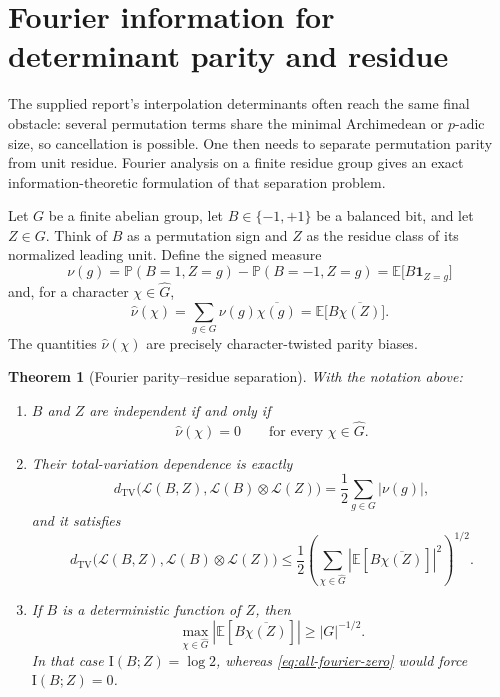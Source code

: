 \documentclass[11pt,oneside]{article}
\newtheorem{theorem}{Theorem}[section]
\theoremstyle{definition}
\theoremstyle{remark}
\newcommand{\Pp}{\mathbb{P}}
\newcommand{\E}{\mathbb{E}}
\newcommand{\II}{\mathrm{I}}
\newcommand{\TV}{d_{\mathrm{TV}}}
\newcommand{\abs}[1]{\left|#1\right|}
\begin{document}
\section{Fourier information for determinant parity and residue}\label{sec:fourier}

The supplied report's interpolation determinants often reach the same final obstacle: several permutation terms share the minimal Archimedean or \(p\)-adic size, so cancellation is possible.  One then needs to separate permutation parity from unit residue.  Fourier analysis on a finite residue group gives an exact information-theoretic formulation of that separation problem.

Let \(G\) be a finite abelian group, let \(B\in\{-1,+1\}\) be a balanced bit, and let \(Z\in G\).  Think of \(B\) as a permutation sign and \(Z\) as the residue class of its normalized leading unit.  Define the signed measure
\begin{equation}\label{eq:signed-measure}
 \nu(g)=\Pp(B=1,Z=g)-\Pp(B=-1,Z=g)
       =\E\bigl[B\mathbf1_{Z=g}\bigr]
\end{equation}
and, for a character \(\chi\in\widehat G\),
\begin{equation}\label{eq:fourier-correlation}
 \widehat\nu(\chi)=\sum_{g\in G}\nu(g)\overline{\chi(g)}
 =\E\bigl[B\overline{\chi(Z)}\bigr].
\end{equation}
The quantities \(\widehat\nu(\chi)\) are precisely character-twisted parity biases.

\begin{theorem}[Fourier parity--residue separation]\label{thm:fourier-separation}
With the notation above:
\begin{enumerate}
 \item \(B\) and \(Z\) are independent if and only if
 \begin{equation}\label{eq:all-fourier-zero}
  \widehat\nu(\chi)=0\qquad\text{for every }\chi\in\widehat G.
 \end{equation}
 \item Their total-variation dependence is exactly
 \begin{equation}\label{eq:tv-nu}
  \TV\bigl(\mathcal L(B,Z),\mathcal L(B)\otimes\mathcal L(Z)\bigr)
  =\frac12\sum_{g\in G}\abs{\nu(g)},
 \end{equation}
 and it satisfies
 \begin{equation}\label{eq:tv-fourier}
  \TV\bigl(\mathcal L(B,Z),\mathcal L(B)\otimes\mathcal L(Z)\bigr)
  \leq\frac12\left(\sum_{\chi\in\widehat G}
  \abs{\E[B\overline{\chi(Z)}]}^2\right)^{1/2}.
 \end{equation}
 \item If \(B\) is a deterministic function of \(Z\), then
 \begin{equation}\label{eq:deterministic-correlation}
  \max_{\chi\in\widehat G}
  \abs{\E[B\overline{\chi(Z)}]}
  \geq\abs{G}^{-1/2}.
 \end{equation}
 In that case \(\II(B;Z)=\log2\), whereas \eqref{eq:all-fourier-zero} would force \(\II(B;Z)=0\).
\end{enumerate}
\end{theorem}
\end{document}
